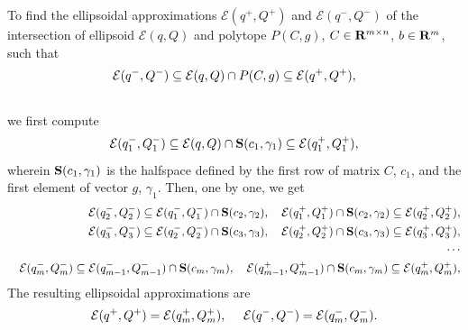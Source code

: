 \documentclass[letterpaper,10pt,english]{sphinxmanual}
\begin{document}
To find the ellipsoidal approximations ${\mathcal E}(q^+,Q^+)$ and
${\mathcal E}(q^-,Q^-)$ of the intersection of ellipsoid
${\mathcal E}(q,Q)$ and polytope $P(C,g)$,
$C\in{\bf R}^{m\times n}$, $b\in{\bf R}^m$, such that
\begin{gather}
\begin{split}{\mathcal E}(q^-,Q^-)\subseteq{\mathcal E}(q,Q)\cap P(C,g)\subseteq{\mathcal E}(q^+,Q^+),\end{split}\notag\\\begin{split}\end{split}\notag
\end{gather}
we first compute
\begin{gather}
\begin{split}{\mathcal E}(q^-_1,Q^-_1)\subseteq{\mathcal E}(q,Q)\cap{\bf S}(c_1,\gamma_1)\subseteq
{\mathcal E}(q^+_1,Q^+_1),\end{split}\notag
\end{gather}
wherein ${\bf S}(c_1,\gamma_1)$ is the halfspace defined by the
first row of matrix $C$, $c_1$, and the first element of
vector $g$, $\gamma_1$. Then, one by one, we get
\begin{gather}
\begin{split}\begin{aligned}
& & {\mathcal E}(q^-_2,Q^-_2)\subseteq{\mathcal E}(q^-_1,Q^-_1)\cap{\bf S}(c_2,\gamma_2), ~~~
{\mathcal E}(q^+_1,Q^+_1)\cap{\bf S}(c_2,\gamma_2)\subseteq{\mathcal E}(q^+_2,Q^+_2), \\
& & {\mathcal E}(q^-_3,Q^-_3)\subseteq{\mathcal E}(q^-_2,Q^-_2)\cap{\bf S}(c_3,\gamma_3), ~~~
{\mathcal E}(q^+_2,Q^+_2)\cap{\bf S}(c_3,\gamma_3)\subseteq{\mathcal E}(q^+_3,Q^+_3), \\
& & \cdots \\
& & {\mathcal E}(q^-_m,Q^-_m)\subseteq{\mathcal E}(q^-_{m-1},Q^-_{m-1})\cap{\bf S}(c_m,\gamma_m), ~~~
{\mathcal E}(q^+_{m-1},Q^+_{m-1})\cap{\bf S}(c_m,\gamma_m)\subseteq{\mathcal E}(q^+_m,Q^+_m), \\\end{aligned}\end{split}\notag
\end{gather}
The resulting ellipsoidal approximations are
\begin{gather}
\begin{split}{\mathcal E}(q^+,Q^+)={\mathcal E}(q^+_m,Q^+_m), ~~~~ {\mathcal E}(q^-,Q^-)={\mathcal E}(q^-_m,Q^-_m) .\end{split}\notag\\\begin{split}\end{split}\notag
\end{gather}
\end{document}
